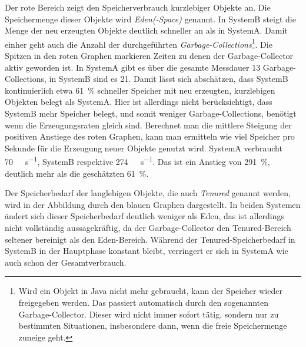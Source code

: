 Der rote Bereich zeigt den Speicherverbrauch kurzlebiger Objekte an. Die Speichermenge dieser Objekte wird \emph{Eden(-Space)} genannt. In SystemB steigt die Menge der neu erzeugten Objekte deutlich schneller an als in SystemA. Damit einher geht auch die Anzahl der durchgeführten \emph{Garbage-Collections}\footnote{Wird ein Objekt in Java nicht mehr gebraucht, kann der Speicher wieder freigegeben werden. Das passiert automatisch durch den sogenannten Garbage-Collector. Dieser wird nicht immer sofort tätig, sondern nur zu bestimmten Situationen, insbesondere dann, wenn die freie Speichermenge zuneige geht.}. Die Spitzen in den roten Graphen markieren Zeiten zu denen der Garbage-Collector aktiv geworden ist. In SystemA gibt es über die gesamte Messdauer 13 Garbage-Collections, in SystemB sind es 21. Damit lässt sich abschätzen, dass SystemB kontinuierlich etwa \SI{61}{\percent} schneller Speicher mit neu erzeugten, kurzlebigen Objekten belegt als SystemA. Hier ist allerdings nicht berücksichtigt, dass SystemB mehr Speicher belegt, und somit  weniger Garbage-Collections, benötigt wenn die Erzeugungsraten gleich sind. Berechnet man die mittlere Steigung der positiven Anstiege des roten Graphen, kann man ermitteln wie viel Speicher pro Sekunde für die Erzeugung neuer Objekte genutzt wird. SystemA verbraucht \SI{70}{\mega\byte\per\second}, SystemB respektive \SI{274}{\mega\byte\per\second}. Das ist ein Anstieg von \SI{291}{\percent}, deutlich mehr als die geschätzten \SI{61}{\percent}.

Der Speicherbedarf der langlebigen Objekte, die auch \emph{Tenured} genannt werden, wird in der Abbildung durch den blauen Graphen dargestellt. In beiden Systemen ändert sich dieser Speicherbedarf deutlich weniger als Eden, das ist allerdings nicht vollständig aussagekräftig, da der Garbage-Collector den Tenured-Bereich seltener bereinigt als den Eden-Bereich. Während der Tenured-Speicherbedarf in SystemB in der Hauptphase konstant bleibt, verringert er sich in SystemA wie auch schon der Gesamtverbrauch. 